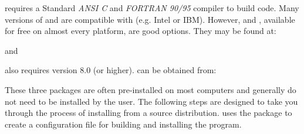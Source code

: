 \parflow{} requires a Standard \emph{ANSI C} and \emph{FORTRAN 90/95}
compiler to build code. Many versions of  and  are
compatible with \parflow{} (e.g. Intel or IBM).  However,  and , available for
free on almost every platform, are good options. They may be found at:
\begin{center}
\end{center}
and
\begin{center}
\end{center}
\parflow{} also requires  version 8.0 (or higher).   can be obtained from:
\begin{center}
\end{center}
These three packages are often pre-installed on most computers and
generally do not need to be installed by the user.  The following
steps are designed to take you through the process of installing
\parflow{} from a source distribution.  \parflow{} uses the 
package  to create a configuration file for building
and installing the \parflow{} program.

